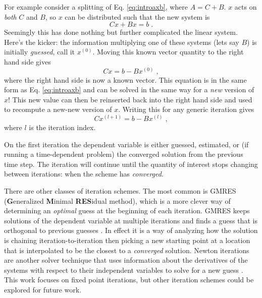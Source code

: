 For example consider a splitting of Eq. \eqref{eq:introaxb}, where $A = C+B$. $x$ acts on \emph{both} $C$ and $B$, so $x$ can be distributed such that the new system is
\begin{equation}
    Cx + Bx = b \; .
\end{equation}
Seemingly this has done nothing but further complicated the linear system.
Here's the kicker: the information multiplying one of these systems (lets say $B$) is initially \emph{guessed}, call it $x^{(0)}$.
Moving this known vector quantity to the right hand side gives
\begin{equation}
    Cx = b - Bx^{(0)} \; ,
\end{equation}
where the right hand side is now a known vector.
This equation is in the same form as Eq. \ref{eq:introaxb} and can be solved in the same way for a \emph{new} version of $x$!
This new value can then be reinserted back into the right hand side and used to recompute a new-new version of $x$.
Writing this for any generic iteration gives
\begin{equation}
\label{eq:introopsplit}
    {C}x^{(l+1)} = b - Bx^{(l)} \; ,
\end{equation}
where $l$ is the iteration index.

On the first iteration the dependent variable is either guessed, estimated, or (if running a time-dependent problem) the converged solution from the previous time step.
The iteration will continue until the quantity of interest stops changing between iterations: when the scheme has \emph{converged}.

There are other classes of iteration schemes. 
The most common is GMRES (\textbf{G}eneralized \textbf{M}inimal \textbf{RES}idual method), which is a more clever way of determining an \emph{optimal} guess at the beginning of each iteration.
GMRES keeps solutions of the dependent variable at multiple iterations and finds a guess that is orthogonal to previous guesses \cite{kylov2004warsa, subspace2004warsa, gmres1996kelley, patton_gmres_2002}.
In effect it is a way of analyzing how the solution is chaining iteration-to-iteration then picking a new starting point at a location that is interpolated to be the closest to a \emph{converged} solution.
Newton iterations are another solver technique that uses information about the derivatives of the systems with respect to their independent variables to solve for a new guess \cite{ctkelle_newton}.
This work focuses on fixed point iterations, but other iteration schemes could be explored for future work.

